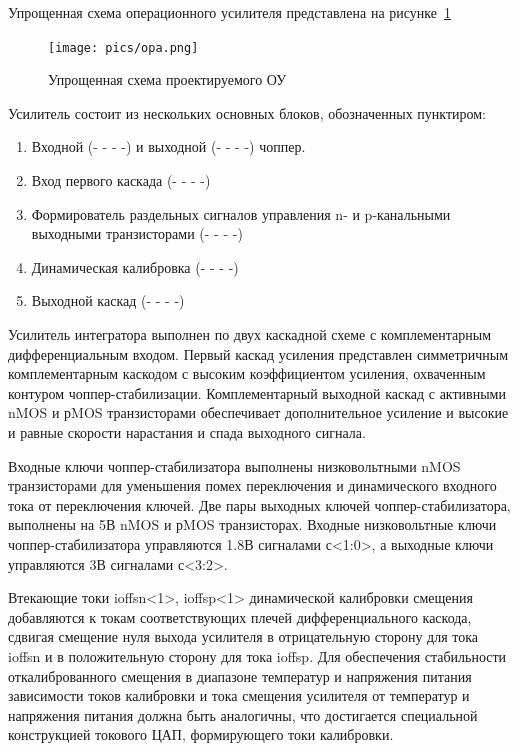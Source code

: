 \documentclass[a4paper,12pt,oneside]{scrartcl}
\begin{document}
Упрощенная схема операционного усилителя представлена на рисунке~\ref{fig:opa}

\begin{figure}[!htb]
\centering
\texttt{[image: pics/opa.png]}
\caption{Упрощенная схема проектируемого ОУ}
\label{fig:opa}
\end{figure}

Усилитель состоит из нескольких основных блоков, обозначенных пунктиром:	


\begin{enumerate}
    \item Входной ({\color{red}- - - -}) и выходной ({\color{purple}- - - -}) чоппер.
	\item Вход первого каскада ({\color{yellow}- - - -})
	\item Формирователь раздельных сигналов управления n- и p-канальными выходными транзисторами (- - - -)
	\item Динамическая калибровка ({\color{green}- - - -})
	\item Выходной каскад ({\color{magenta}- - - -})
\end{enumerate}

Усилитель интегратора выполнен по двух каскадной схеме с комплементарным дифференциальным входом. Первый каскад усиления представлен симметричным комплементарным каскодом с высоким коэффициентом усиления, охваченным контуром чоппер-стабилизации. Комплементарный выходной каскад с активными nMOS и рMOS транзисторами обеспечивает дополнительное усиление и высокие и равные скорости нарастания и спада выходного сигнала.

Входные ключи чоппер-стабилизатора выполнены низковольтными nMOS транзисторами для уменьшения помех переключения и динамического входного тока от переключения ключей. Две пары выходных ключей чоппер-стабилизатора, выполнены на 5В nMOS  и рMOS транзисторах. Входные низковольтные ключи чоппер-стабилизатора управляются 1.8В сигналами с<1:0>, а  выходные  ключи управляются 3В сигналами с<3:2>.

Втекающие токи ioffsn<1>, ioffsp<1> динамической калибровки смещения добавляются к токам соответствующих плечей дифференциального каскода, сдвигая смещение нуля выхода усилителя в отрицательную сторону  для тока ioffsn и в положительную сторону для тока ioffsp. Для обеспечения стабильности откалиброванного смещения в диапазоне температур и напряжения питания зависимости токов калибровки и тока смещения усилителя от температур и напряжения питания должна быть аналогичны, что достигается специальной конструкцией токового ЦАП, формирующего токи калибровки.
\end{document}
